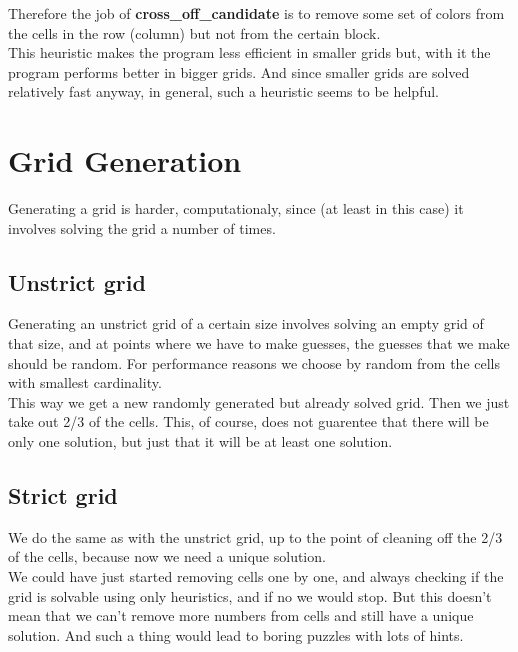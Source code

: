 \documentclass[english,a4paper]{article}
\begin{document}
Therefore the job of \textbf{cross\_off\_candidate} is to remove some
set of colors from the cells in the row (column) but not from the
certain block.\\

This heuristic makes the program less efficient in smaller grids but,
with it the program performs better in bigger grids. And since smaller
grids are solved relatively fast anyway, in general, such a heuristic
seems to be helpful. \\

\section{Grid Generation}

Generating a grid is harder, computationaly, since (at least in this
case) it involves solving the grid a number of times.\\

\subsection{Unstrict grid}

Generating an unstrict grid of a certain size involves solving an
empty grid of that size, and at points where we have to make guesses,
the guesses that we make should be random. For performance reasons we
choose by random from the cells with smallest cardinality.\\

This way we get a new randomly generated but already solved grid. Then
we just take out 2/3 of the cells. This, of course, does not guarentee
that there will be only one solution, but just that it will be at
least one solution.\\

\subsection{Strict grid}

We do the same as with the unstrict grid, up to the point of cleaning
off the 2/3 of the cells, because now we need a unique solution.\\

We could have just started removing cells one by one, and always
checking if the grid is solvable using only heuristics, and if no we
would stop. But this doesn't mean that we can't remove more numbers
from cells and still have a unique solution. And such a thing would
lead to boring puzzles with lots of hints.\\
\end{document}
